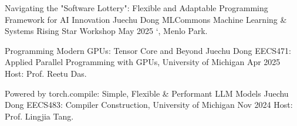 
\PubItemCV
{Navigating the "Software Lottery": Flexible and Adaptable Programming Framework for AI Innovation} %
{Juechu Dong} %
{MLCommons Machine Learning \& Systems Rising Star Workshop} %
{May 2025} %
{\char`\@Meta, Menlo Park. } %
{} %

\PubItemCV
{Programming Modern GPUs: Tensor Core and Beyond} %
{Juechu Dong} %
{EECS471: Applied Parallel Programming with GPUs, University of Michigan} %
{Apr 2025} %
{Host: Prof. Reetu Das.} %
{} %


\PubItemCV
{Powered by torch.compile: Simple, Flexible \& Performant LLM Models} %
{Juechu Dong} %
{EECS483: Compiler Construction, University of Michigan} %
{Nov 2024} %
{Host: Prof. Lingjia Tang.} %
{} %


\PubListEnd